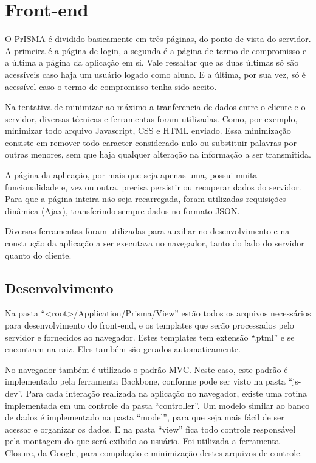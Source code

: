 \documentclass[graduacao,brazil]{ThesisPUC}
\begin{document}
\section{Front-end}

O PrISMA é dividido basicamente em três páginas, do ponto de vista do servidor. A primeira é a página de login, a segunda é a página de termo de compromisso e a última a página da aplicação em si. Vale ressaltar que as duas últimas só são acessíveis caso haja um usuário logado como aluno. E a última, por sua vez, só é acessível caso o termo de compromisso tenha sido aceito.

Na tentativa de minimizar ao máximo a tranferencia de dados entre o cliente e o servidor, diversas técnicas e ferramentas foram utilizadas. Como, por exemplo, minimizar todo arquivo Javascript, CSS e HTML enviado. Essa minimização consiste em remover todo caracter considerado nulo ou substituir palavras por outras menores, sem que haja qualquer alteração na informação a ser transmitida.

A página da aplicação, por mais que seja apenas uma, possui muita funcionalidade e, vez ou outra, precisa persistir ou recuperar dados do servidor. Para que a página inteira não seja recarregada, foram utilizadas requisições dinâmica (Ajax), transferindo sempre dados no formato JSON.

Diversas ferramentas foram utilizadas para auxiliar no desenvolvimento e na construção da aplicação a ser executava no navegador, tanto do lado do servidor quanto do cliente.

\subsection{Desenvolvimento}

Na pasta “<root>/Application/Prisma/View” estão todos os arquivos necessários para desenvolvimento do front-end, e os templates que serão processados pelo servidor e fornecidos ao navegador. Estes templates tem extensão “.ptml” e se encontram na raiz. Eles também são gerados automaticamente.

No navegador também é utilizado o padrão MVC. Neste caso, este padrão é implementado pela ferramenta Backbone, conforme pode ser visto na pasta “js-dev”. Para cada interação realizada na aplicação no navegador, existe uma rotina implementada em um controle da pasta “controller”. Um modelo similar ao banco de dados é implementado na pasta “model”, para que seja mais fácil de ser acessar e organizar os dados. E na pasta “view” fica todo controle responsável pela montagem do que será exibido ao usuário. Foi utilizada a ferramenta Closure, da Google, para compilação e minimização destes arquivos de controle.
\end{document}
